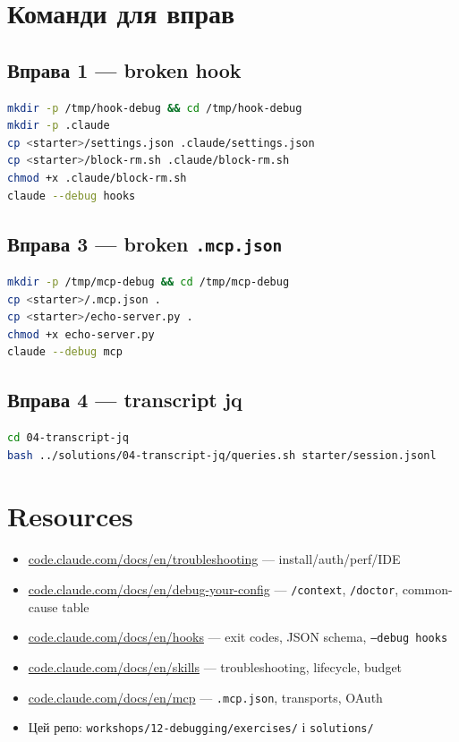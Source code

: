 \documentclass[11pt,a4paper]{article}
\begin{document}
\section{Команди для вправ}

\subsection{Вправа 1 --- broken hook}

\begin{lstlisting}[language=bash]
mkdir -p /tmp/hook-debug && cd /tmp/hook-debug
mkdir -p .claude
cp <starter>/settings.json .claude/settings.json
cp <starter>/block-rm.sh .claude/block-rm.sh
chmod +x .claude/block-rm.sh
claude --debug hooks
\end{lstlisting}

\subsection{Вправа 3 --- broken \texttt{.mcp.json}}

\begin{lstlisting}[language=bash]
mkdir -p /tmp/mcp-debug && cd /tmp/mcp-debug
cp <starter>/.mcp.json .
cp <starter>/echo-server.py .
chmod +x echo-server.py
claude --debug mcp
\end{lstlisting}

\subsection{Вправа 4 --- transcript jq}

\begin{lstlisting}[language=bash]
cd 04-transcript-jq
bash ../solutions/04-transcript-jq/queries.sh starter/session.jsonl
\end{lstlisting}

\section{Resources}

\begin{itemize}
\item \href{https://code.claude.com/docs/en/troubleshooting}{code.claude.com/docs/en/troubleshooting} --- install/auth/perf/IDE
\item \href{https://code.claude.com/docs/en/debug-your-config}{code.claude.com/docs/en/debug-your-config} --- \texttt{/context}, \texttt{/doctor}, common-cause table
\item \href{https://code.claude.com/docs/en/hooks}{code.claude.com/docs/en/hooks} --- exit codes, JSON schema, \texttt{--debug hooks}
\item \href{https://code.claude.com/docs/en/skills}{code.claude.com/docs/en/skills} --- troubleshooting, lifecycle, budget
\item \href{https://code.claude.com/docs/en/mcp}{code.claude.com/docs/en/mcp} --- \texttt{.mcp.json}, transports, OAuth
\item Цей репо: \texttt{workshops/12-debugging/exercises/} і \texttt{solutions/}
\end{itemize}
\end{document}

